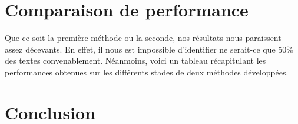 \documentclass[a4paper]{article}
\begin{document}

\section{Comparaison de performance}

Que ce soit la première méthode ou la seconde, nos résultats nous paraissent assez décevants. En effet, il nous est impossible d'identifier ne serait-ce que 50\% des textes convenablement. Néanmoins, voici un tableau récapitulant les performances obtenues sur les différents stades de deux méthodes développées.


\section{Conclusion}

\end{document}
